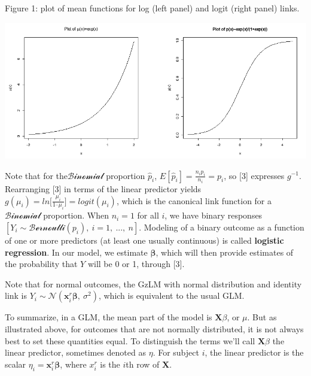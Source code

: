 \documentclass[
  9pt,
  ignorenonframetext,
]{beamer}
\begin{document}
\begin{frame}{Figure 1: plot of mean functions for log (left panel) and
logit (right panel) links.}
\protect\hypertarget{figure-1-plot-of-mean-functions-for-log-left-panel-and-logit-right-panel-links.}{}
\begin{center}\includegraphics[width=0.4\linewidth]{figs_L13/poisson} \end{center}

Note that for the\(\mathcal {Binomial}\) proportion \(\hat p_i\),
\(E[\hat p_i] = \frac {n_i p_i } {n_i} = p_i\), so {[}3{]} expresses
\(g^{-1}\). Rearranging {[}3{]} in terms of the linear predictor yields
\(g(\mu_i )=ln \big[\frac {\mu_i} {1–\mu_i} \big]=logit(\mu_i)\), which
is the canonical link function for a\(\mathcal {Binomial}\) proportion.
When \(n_i=1\) for all \(i\), we have binary responses
\([Y_i \sim \mathcal {Bernoulli}(p_i),\ i = 1,\ ...,\ n]\). Modeling of
a binary outcome as a function of one or more predictors (at least one
usually continuous) is called \textbf{logistic regression}. In our
model, we estimate \(\pmb \beta\), which will then provide estimates of
the probability that \(Y\) will be 0 or 1, through {[}3{]}.
\end{frame}

\begin{frame}{}
\protect\hypertarget{section-2}{}
Note that for normal outcomes, the GzLM with normal distribution and
identity link is
\(Y_i\sim \mathcal N(\pmb x_i^r \pmb \beta,\ \sigma^2)\), which is
equivalent to the usual GLM.

To summarize, in a GLM, the mean part of the model is \(\pmb X\beta\),
or \(\mu\). But as illustrated above, for outcomes that are not normally
distributed, it is not always best to set these quantities equal. To
distinguish the terms we'll call \(\pmb X\beta\) the linear predictor,
sometimes denoted as \(\eta\). For subject \(i\), the linear predictor
is the scalar \(\eta_i=\pmb x_i^r \pmb \beta\), where \(x_i^r\) is the
\(i\)th row of \(\pmb X\).
\end{frame}
\end{document}
